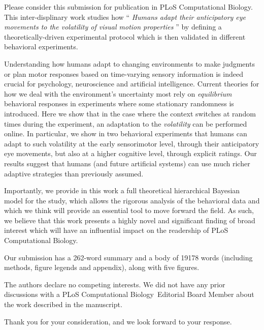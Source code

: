 \documentclass[stdletter,8pt,dateno]{newlfm}%
\newcommand{\Title}{
Humans adapt their anticipatory eye movements to the volatility of visual motion properties
}
\newcommand{\Journal}{PLoS Computational Biology}%
\begin{document}
\begin{newlfm}
%
Please consider this submission for publication in \Journal . This inter-displinary work studies how ``\emph{\Title}'' by defining a theoretically-driven experimental protocol which is then validated in different behavioral experiments.

Understanding how humans adapt to changing environments to make judgments or plan motor responses based on time-varying sensory information 
is indeed crucial for psychology, neuroscience
and artificial intelligence.  
Current theories for how we deal with the environment's uncertainty most rely on \emph{equilibrium} behavioral responses in experiments where some stationary randomness is introduced.  
Here we show that in the case where the context switches at random times during the experiment, an adaptation to the \emph{volatility} can be performed online.
In particular, we show in two behavioral experiments that humans can adapt to such volatility at the early sensorimotor level, through their anticipatory eye movements, but also at a higher cognitive level, through explicit ratings. 
Our results suggest that humans (and future artificial
systems) can use much richer adaptive strategies than previously
assumed.

Importantly, we provide in this work a full theoretical hierarchical Bayesian model for the study, which allows the rigorous analysis of the behavioral data and which we think will provide an essential tool to move forward the field. 
As such, we believe that this work presents a highly novel and significant finding of broad interest 
which will have an influential impact on the readership of \Journal .

Our submission has a 262-word summary and a body of 19178 words
(including methods, figure legends and appendix), along with five figures.

The authors declare no competing interests.
We did not have any prior discussions with
a \Journal\ Editorial Board Member
about the work described in the manuscript.

Thank you for your consideration, and we look forward to your response.

\end{newlfm}
\end{document}
